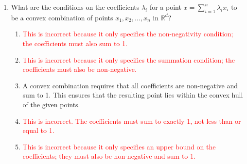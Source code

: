 \documentclass{article}%
\newcommand{\incorrect}[1]{\textcolor{red}{#1}}
\begin{document}
\begin{enumerate}
\begin{enumerate}
\item \incorrect{This is incorrect. The x-coordinate of this convex combination is $\frac{7}{4}$, not 2.}%
\item \incorrect{This is incorrect. The x-coordinate of this convex combination is $\frac{11}{4}$, not 2.}%
\end{enumerate}%
\vspace{1em}%
\item What are the conditions on the coefficients $\lambda_i$ for a point $x = \sum_{i=1}^n \lambda_i x_i$ to be a convex combination of points $x_1, x_2, \dots, x_n$ in $\mathbb{R}^d$?%
\begin{enumerate}%
\item \incorrect{This is incorrect because it only specifies the non-negativity condition; the coefficients must also sum to 1.}%
\item \incorrect{This is incorrect because it only specifies the summation condition; the coefficients must also be non-negative.}%
\item A convex combination requires that all coefficients are non-negative and sum to 1. This ensures that the resulting point lies within the convex hull of the given points.%
\item \incorrect{This is incorrect. The coefficients must sum to exactly 1, not less than or equal to 1.}%
\item \incorrect{This is incorrect because it only specifies an upper bound on the coefficients; they must also be non-negative and sum to 1.}%
\end{enumerate}%
\vspace{1em}%
\end{enumerate}

%
\end{document}
